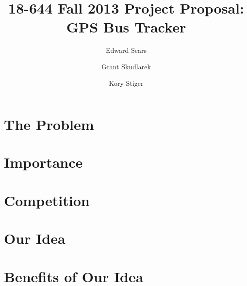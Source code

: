 \documentclass[pageno]{jpaper}
\begin{document}
\title{
18-644 Fall 2013 Project Proposal: GPS Bus Tracker}
\author{Edward Sears \and Grant Skudlarek \and Kory Stiger}

\date{}
\maketitle

\thispagestyle{empty}

\begin{abstract}
\end{abstract}

\section{The Problem}


\section{Importance}


\section{Competition}


\section{Our Idea}


\section{Benefits of Our Idea}




\end{document}
